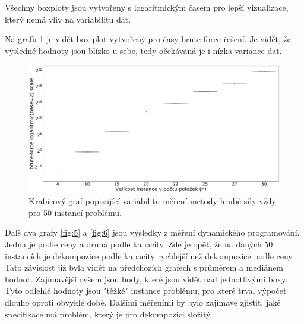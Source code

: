 \documentclass[11pt]{article}
\begin{document}
Všechny boxploty jsou vytvořeny s logaritmickým časem pro lepší vizualizace, který nemá vliv na variabilitu dat.

Na grafu \ref{fig:4} je vidět box plot vytvořený pro časy brute force řešení. Je vidět, že výsledné hodnoty jsou blízko u sebe, tedy očekávaná je i nízka variance dat. 

\begin{figure}[h]\centering
	\includegraphics[scale=0.2]{img/boxB}
 	\caption[2]{Krabicový graf popisující variabilitu měření metody hrubé síly vždy pro 50 instancí problému.}\label{fig:4}
 \end{figure} 		

Dalš dva grafy \ref{fig:5} a \ref{fig:6} jsou výsledky z měření dynamického programování. Jedna je podle ceny a druhá podle kapacity. Zde je opět, že na daných 50 instancích je dekompozice podle kapacity rychlejší než dekompozice podle ceny. Tato závislost již byla vidět na předchozích grafech s průměrem a mediánem hodnot. Zajímavější ovšem jsou body, které jsou vidět nad jednotlivými boxy. Tyto odlehlé hodnoty jsou "těžké" instance problému, pro které trval výpočet dlouho oproti obvyklé době. Dalšími měřeními by bylo zajímavé zjistit, jaké specifikace má problém, který je pro dekompozici složitý.
\end{document}
